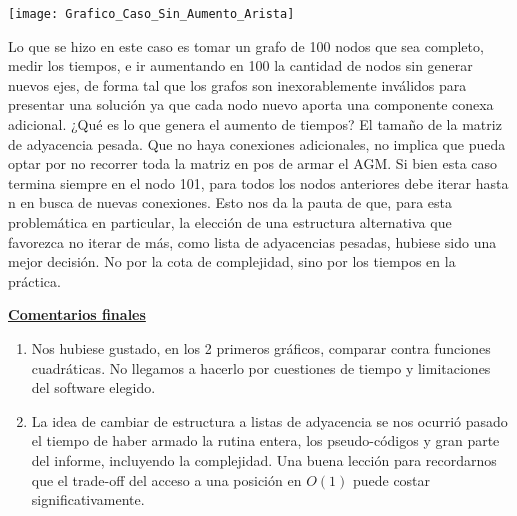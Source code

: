 \documentclass[10pt,a4paper]{article}
\begin{document}
\texttt{[image: Grafico\_Caso\_Sin\_Aumento\_Arista]}

Lo que se hizo en este caso es tomar un grafo de 100 nodos que sea completo, medir los tiempos, e ir aumentando en 100 la cantidad de nodos sin generar nuevos ejes, de forma tal que los grafos son inexorablemente inválidos para presentar una solución ya que cada nodo nuevo aporta una componente conexa adicional. ¿Qué es lo que genera el aumento de tiempos? El tamaño de la matriz de adyacencia pesada. Que no haya conexiones adicionales, no implica que pueda optar por no recorrer toda la matriz en pos de armar el AGM. Si bien esta caso termina siempre en el nodo 101, para todos los nodos anteriores debe iterar hasta n en busca de nuevas conexiones. Esto nos da la pauta de que, para esta problemática en particular, la elección de una estructura alternativa que favorezca no iterar de más, como lista de adyacencias pesadas, hubiese sido una mejor decisión. No por la cota de complejidad, sino por los tiempos en la práctica.

\noindent \textbf{\underline{Comentarios finales}}

\begin{enumerate}
\item Nos hubiese gustado, en los 2 primeros gráficos, comparar contra funciones cuadráticas. No llegamos a hacerlo por cuestiones de tiempo y limitaciones del software elegido.
\item La idea de cambiar de estructura a listas de adyacencia se nos ocurrió pasado el tiempo de haber armado la rutina entera, los pseudo-códigos y gran parte del informe, incluyendo la complejidad. Una buena lección para recordarnos que el trade-off del acceso a una posición en $O(1)$ puede costar significativamente.
\end{enumerate}
\end{document}
